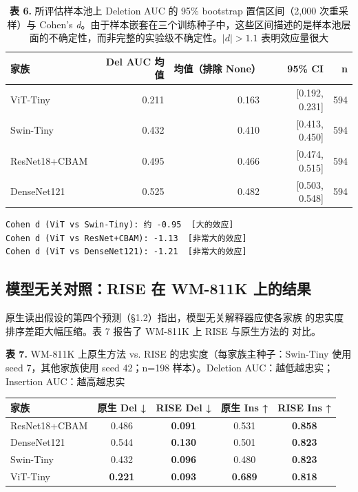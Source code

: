 \documentclass[11pt,a4paper]{article}
\begin{document}
\begin{table}[htbp]
\centering
\small
\caption{\textbf{表 6.} 所评估样本池上 Deletion AUC 的 95\% bootstrap 置信区间（2,000 次重采样）与 Cohen's \emph{d}。由于样本嵌套在三个训练种子中，这些区间描述的是样本池层面的不确定性，而非完整的实验级不确定性。$|d| > 1.1$ 表明效应量很大}
\begin{tabular}{lrrrr}
\toprule
家族 & Del AUC 均值 & 均值（排除 None） & 95\% CI & n \\
\midrule
ViT-Tiny & 0.211 & 0.163 & [0.192, 0.231] & 594 \\
Swin-Tiny & 0.432 & 0.410 & [0.413, 0.450] & 594 \\
ResNet18+CBAM & 0.495 & 0.466 & [0.474, 0.515] & 594 \\
DenseNet121 & 0.525 & 0.482 & [0.503, 0.548] & 594 \\
\bottomrule
\end{tabular}
\end{table}

\begin{Verbatim}
Cohen d (ViT vs Swin-Tiny): 约 -0.95  [大的效应]
Cohen d (ViT vs ResNet+CBAM): -1.13  [非常大的效应]
Cohen d (ViT vs DenseNet121): -1.21  [非常大的效应]
\end{Verbatim}



\subsection{模型无关对照：RISE 在 WM-811K 上的结果}

原生读出假设的第四个预测（§1.2）指出，模型无关解释器应使各家族 的忠实度排序差距大幅压缩。表 7 报告了 WM-811K 上 RISE 与原生方法的 对比。

\begin{center}
\small \textbf{表 7.} WM-811K 上原生方法 vs. RISE 的忠实度（每家族主种子：Swin-Tiny 使用 seed 7，其他家族使用 seed 42；n=198 样本）。Deletion AUC：越低越忠实；Insertion AUC：越高越忠实
\end{center}

\begin{tabular}{lcccc}
\toprule
家族 & 原生 Del ↓ & RISE Del ↓ & 原生 Ins ↑ & RISE Ins ↑ \\
\midrule
ResNet18+CBAM & 0.486 & \textbf{0.091} & 0.531 & \textbf{0.858} \\
DenseNet121 & 0.544 & \textbf{0.130} & 0.501 & \textbf{0.823} \\
Swin-Tiny & 0.432 & \textbf{0.096} & 0.480 & \textbf{0.823} \\
ViT-Tiny & \textbf{0.221} & \textbf{0.093} & \textbf{0.689} & \textbf{0.818} \\
\bottomrule
\end{tabular}
\end{document}
